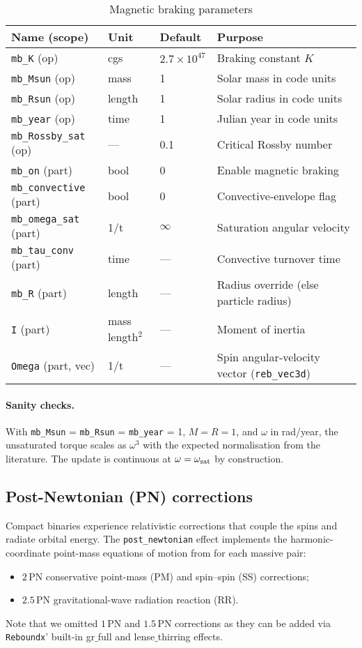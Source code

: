 \documentclass[11pt]{article}
\begin{document}
\begin{table}[h]
\centering\footnotesize
\caption{Magnetic braking parameters}
\label{tab:mb}
\begin{tabular}{@{}llll@{}}
\toprule
Name (scope) & Unit & Default & Purpose \\
\midrule
\texttt{mb\_K} (op) & cgs & $2.7\times10^{47}$ & Braking constant $K$\\
\texttt{mb\_Msun} (op) & mass & 1 & Solar mass in code units\\
\texttt{mb\_Rsun} (op) & length & 1 & Solar radius in code units\\
\texttt{mb\_year} (op) & time & 1 & Julian year in code units\\
\texttt{mb\_Rossby\_sat} (op) & — & 0.1 & Critical Rossby number\\
\texttt{mb\_on} (part) & bool & 0 & Enable magnetic braking\\
\texttt{mb\_convective} (part) & bool & 0 & Convective‑envelope flag\\
\texttt{mb\_omega\_sat} (part) & 1/t & $\infty$ & Saturation angular velocity\\
\texttt{mb\_tau\_conv} (part) & time & — & Convective turnover time\\
\texttt{mb\_R} (part) & length & — & Radius override (else particle radius)\\
\texttt{I} (part) & mass\,length$^2$ & — & Moment of inertia\\
\texttt{Omega} (part, vec) & 1/t & — & Spin angular‑velocity vector (\texttt{reb\_vec3d})\\
\bottomrule
\end{tabular}
\end{table}

\paragraph{Sanity checks.}
With \texttt{mb\_Msun} = \texttt{mb\_Rsun} = \texttt{mb\_year} = 1, $M=R=1$,
and $\omega$ in rad/year, the unsaturated torque scales as $\omega^3$ with the
expected normalisation from the literature. The update is continuous at
$\omega=\omega_{\rm sat}$ by construction.


\subsection{Post-Newtonian (PN) corrections}
\label{sec:pn}

Compact binaries experience relativistic corrections that couple the spins and
radiate orbital energy. The \texttt{post\_newtonian} effect implements the
harmonic-coordinate point-mass equations of motion from \citet{Kidder1995} for
each massive pair:
\begin{itemize}[nosep,leftmargin=1.8em]
  \item $2$\,PN conservative point-mass (PM) and spin--spin (SS) corrections;
  \item $2.5$\,PN gravitational-wave radiation reaction (RR).
\end{itemize}
Note that we omitted  $1$\,PN and $1.5$\,PN corrections as they can be added via \texttt{Reboundx}' built-in gr$\_$full and lense$\_$thirring effects.
\end{document}
